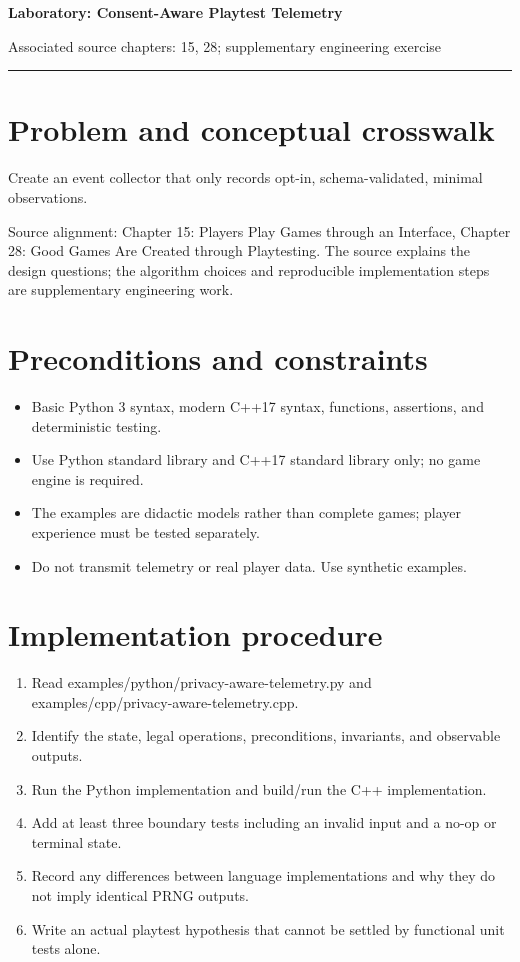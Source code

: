 \documentclass[11pt]{article}
\begin{document}
{\huge\bfseries\color{suiteblue} Laboratory: Consent-Aware Playtest Telemetry}\par
\vspace{0.15in}
{\normalsize\color{suitegray} Associated source chapters: 15, 28; supplementary engineering exercise}\par
\vspace{0.15in}\hrule\vspace{0.15in}

\section{Problem and conceptual crosswalk}
Create an event collector that only records opt-in, schema-validated, minimal observations.

Source alignment: Chapter 15: Players Play Games through an Interface, Chapter 28: Good Games Are Created through Playtesting. The source explains the design questions; the algorithm choices and reproducible implementation steps are supplementary engineering work.


\section{Preconditions and constraints}
\begin{itemize}
\item Basic Python 3 syntax, modern C++17 syntax, functions, assertions, and deterministic testing.
\item Use Python standard library and C++17 standard library only; no game engine is required.
\item The examples are didactic models rather than complete games; player experience must be tested separately.
\item Do not transmit telemetry or real player data. Use synthetic examples.
\end{itemize}

\section{Implementation procedure}
\begin{enumerate}
\item Read examples/python/privacy-aware-telemetry.py and examples/cpp/privacy-aware-telemetry.cpp.
\item Identify the state, legal operations, preconditions, invariants, and observable outputs.
\item Run the Python implementation and build/run the C++ implementation.
\item Add at least three boundary tests including an invalid input and a no-op or terminal state.
\item Record any differences between language implementations and why they do not imply identical PRNG outputs.
\item Write an actual playtest hypothesis that cannot be settled by functional unit tests alone.
\end{enumerate}
\end{document}
